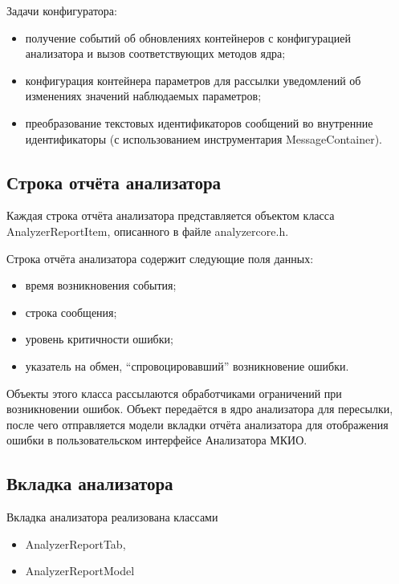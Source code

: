 Задачи конфигуратора:

\begin{itemize}
 \item получение событий об обновлениях контейнеров с конфигурацией анализатора 
и вызов соответствующих методов ядра;
 \item конфигурация контейнера параметров для рассылки уведомлений об 
изменениях значений наблюдаемых параметров;
 \item преобразование текстовых идентификаторов сообщений во внутренние 
идентификаторы (с использованием инструментария MessageContainer).
\end{itemize}

\subsection{Строка отчёта анализатора}
\label{subsec:reportitem}

Каждая строка отчёта анализатора представляется объектом класса 
AnalyzerReportItem, описанного в файле analyzercore.h.

Строка отчёта анализатора содержит следующие поля данных:

\begin{itemize}
 \item время возникновения события;
 \item строка сообщения;
 \item уровень критичности ошибки;
 \item указатель на обмен, ``спровоцировавший'' возникновение ошибки.
\end{itemize}

Объекты этого класса рассылаются обработчиками ограничений при возникновении 
ошибок. Объект передаётся в ядро анализатора для пересылки, после чего 
отправляется модели вкладки отчёта анализатора для отображения ошибки в 
пользовательском интерфейсе Анализатора МКИО.

\subsection{Вкладка анализатора}

Вкладка анализатора реализована классами

\begin{itemize}
 \item AnalyzerReportTab,
 \item AnalyzerReportModel
\end{itemize}

